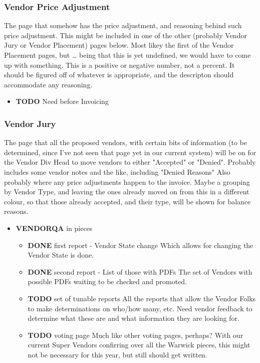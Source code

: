 \documentclass[captions=tablesignature]{scrartcl}
\begin{document}
\subsubsection{Vendor Price Adjustment}
\label{sec-3-1-10}
The page that somehow has the price adjustment, and reasoning
behind such price adjustment.
This might be included in one of the other (probably Vendor Jury
or Vendor Placement) pages below.  Most likey the first of the
Vendor Placement pages, but \ldots{} being that this is yet undefined,
we would have to come up with something.
This is a positive or negative number, not a percent.  It should
be figured off of whatever is appropriate, and the descripton
should accommodate any reasoning.
\begin{itemize}
\item {\bfseries\sffamily TODO} Need before Invoicing
\label{sec-3-1-10-1}
\end{itemize}

\subsubsection{Vendor Jury}
\label{sec-3-1-11}
The page that all the proposed vendors, with certain bits of
information (to be determined, since I've not seen that page yet
in our current system) will be on for the Vendor Div Head to move
vendors to either "Accepted" or "Denied".  Probably includes some
vendor notes and the like, including "Denied Reasons" Also
probably where any price adjustments happen to the invoice.  Maybe
a grouping by Vendor Type, and leaving the ones already moved on
from this in a different colour, so that those already accepted,
and their type, will be shown for balance reasons.
\begin{itemize}
\item {\bfseries\sffamily VENDORQA} in pieces
\label{sec-3-1-11-1}
\begin{itemize}
\item {\bfseries\sffamily DONE} first report - Vendor State change
\label{sec-3-1-11-1-1}
Which allows for changing the Vendor State is done.

\item {\bfseries\sffamily DONE} second report - List of those with PDFs
\label{sec-3-1-11-1-2}
The set of Vendors with possible PDFs waiting to be checked and
promoted.

\item {\bfseries\sffamily TODO} set of tunable reports
\label{sec-3-1-11-1-3}
All the reports that allow the Vendor Folks to make
determinations on who/how many, etc.  Need vendor feedback to
determine what these are and what information they are looking
for.

\item {\bfseries\sffamily TODO} voting page
\label{sec-3-1-11-1-4}
Much like other voting pages, perhaps?  With our current Super
Vendors confirring over all the Warwick pieces, this might not
be necessary for this year, but still should get written.
\end{itemize}
\end{itemize}
\end{document}
